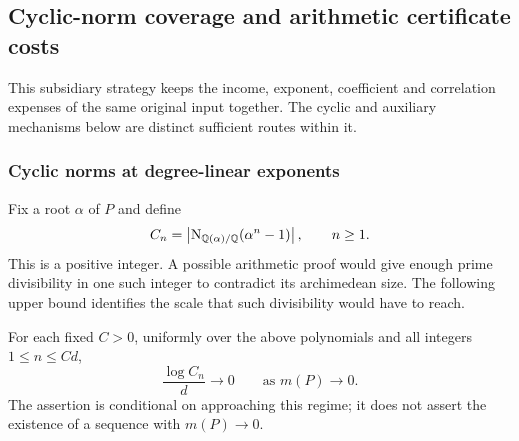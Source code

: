 \subsection{Cyclic-norm coverage and arithmetic certificate costs}
\label{sec:arithmetic-certificates}

This subsidiary strategy keeps the income, exponent, coefficient and correlation expenses of the same original input together.
The cyclic and auxiliary mechanisms below are distinct sufficient routes within it.

\subsubsection{Cyclic norms at degree-linear exponents}
\label{ar:cyclic}

Fix a root $\alpha$ of $P$ and define
\[
 C_n=\left|\operatorname{N}_{\mathbb Q(\alpha)/\mathbb Q}
                         (\alpha^n-1)\right|,\qquad n\ge1.
\]
This is a positive integer.
A possible arithmetic proof would give enough prime divisibility in one such integer to contradict its archimedean size.
The following upper bound identifies the scale that such divisibility would have to reach.

\begin{proposition}\label{ar:cyclic-cost}
For each fixed $C>0$, uniformly over the above polynomials and all integers $1\le n\le Cd$,
\[
 \frac{\log C_n}{d}\longrightarrow0\qquad\text{as }m(P)\longrightarrow0.
\]
The assertion is conditional on approaching this regime; it does not assert the existence of a sequence with $m(P)\to0$.
\end{proposition}

